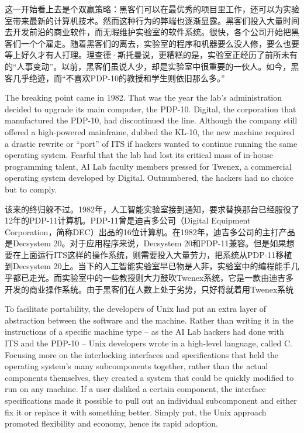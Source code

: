 \ifdefined\chs
这一开始看上去是个双赢策略：黑客们可以在最优秀的项目里工作，还可以为实验室带来最新的计算机技术。然而这种行为的弊端也逐渐显露。黑客们投入大量时间去开发前沿的商业软件，而无暇维护实验室的软件系统。很快，各个公司开始把黑客们一个个雇走。随着黑客们的离去，实验室的程序和机器要么没人修，要么也要等上好久才有人打理。理查德·斯托曼说，更糟糕的是，实验室正经历了前所未有的``人事变动''。以前，黑客们虽说人少，却是实验室中很重要的一伙人。如今，黑客几乎绝迹，而``不喜欢PDP-10的教授和学生则依旧那么多。''
\fi

\ifdefined\eng
The breaking point came in 1982. That was the year the lab's administration decided to upgrade its main computer, the PDP-10. Digital, the corporation that manufactured the PDP-10, had discontinued the line. Although the company still offered a high-powered mainframe, dubbed the KL-10, the new machine required a drastic rewrite or ``port'' of ITS if hackers wanted to continue running the same operating system. Fearful that the lab had lost its critical mass of in-house programming talent, AI Lab faculty members pressed for Twenex, a commercial operating system developed by Digital. Outnumbered, the hackers had no choice but to comply.
\fi

\ifdefined\chs
该来的终归躲不过。1982年，人工智能实验室接到通知，要求替换那台已经服役了12年的PDP-11计算机。PDP-11曾是迪吉多公司（Digital Equipment Corporation，简称DEC）出品的16位计算机。在1982年，迪吉多公司的主打产品是Decsystem 20。对于应用程序来说，Decsystem 20和PDP-11兼容。但是如果想要在上面运行ITS这样的操作系统，则需要投入大量劳力，把系统从PDP-11移植到Decsystem 20上。当下的人工智能实验室早已物是人非，实验室中的编程能手几乎都已走光。而实验室中的一些教授则大力鼓吹Twenex系统，它是一款由迪吉多开发的商业操作系统。由于黑客们在人数上处于劣势，只好将就着用Twenex系统
\fi

\fi

\ifdefined\vtwo
\ifdefined\eng
To facilitate portability, the developers of Unix had put an extra layer of abstraction between the software and the machine. Rather than writing it in the instructions of a specific machine type -- as the AI Lab hackers had done with ITS and the PDP-10 -- Unix developers wrote in a high-level language, called C. Focusing more on the interlocking interfaces and specifications that held the operating system's many subcomponents together, rather than the actual components themselves, they created a system that could be quickly modified to run on any machine. If a user disliked a certain component, the interface specifications made it possible to pull out an individual subcomponent and either fix it or replace it with something better. Simply put, the Unix approach promoted flexibility and economy, hence its rapid adoption.
\fi

